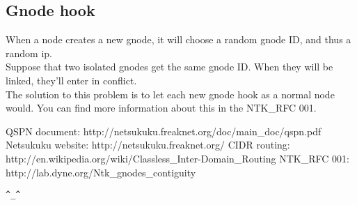 \documentclass[a4paper]{article}
\newcommand{\href}[2]{ #1 }
\begin{document}
\subsection{Gnode hook}
When a node creates a new gnode, it will choose a random gnode ID, and thus
a random ip.\\
Suppose that two isolated gnodes get the same gnode ID. When they will be
linked, they'll enter in conflict.\\
The solution to this problem is to let each new gnode hook as a normal node
would. You can find more information about this in the NTK\_RFC 001\cite{gnodecontiguity}.


%


\begin{thebibliography}{99}
	 QSPN document:
		\href{http://netsukuku.freaknet.org/doc/main\_doc/qspn.pdf}{qspn.pdf}
	 Netsukuku website:
		\href{http://netsukuku.freaknet.org/}{http://netsukuku.freaknet.org/}
	 CIDR routing:
		\href{http://en.wikipedia.org/wiki/Classless\_Inter-Domain\_Routing}{Classless\_Inter-Domain\_Routing in Wikipedia}
	 NTK\_RFC 001:
		\href{http://lab.dyne.org/Ntk\_gnodes\_contiguity}{Gnode contiguity}
\end{thebibliography}
\newpage

\begin{center}
\verb|^_^|
\end{center}
\end{document}
